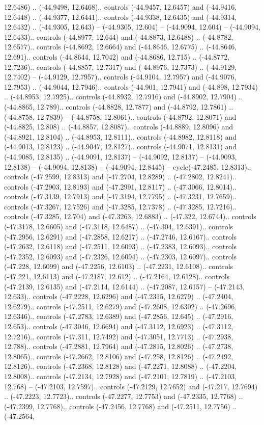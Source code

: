 \begin{scope}[shift={(2.5552, 9.9912)}]
\begin{scope}[shift={(48.1654, -14.8546)}]
12.6486) .. (-44.9498, 12.6468).. controls (-44.9457, 12.6457) and (-44.9416, 12.6448) .. (-44.9377, 12.6441).. controls (-44.9338, 12.6435) and (-44.9314, 12.6432) .. (-44.9305, 12.643) -- (-44.9305, 12.604) -- (-44.9094, 12.604) -- (-44.9094, 12.6433).. controls (-44.8977, 12.644) and (-44.8873, 12.6488) .. (-44.8782, 12.6577).. controls (-44.8692, 12.6664) and (-44.8646, 12.6775) .. (-44.8646, 12.691).. controls (-44.8644, 12.7042) and (-44.8686, 12.715) .. (-44.8772, 12.7236).. controls (-44.8857, 12.7317) and (-44.8976, 12.7373) .. (-44.9129, 12.7402) -- (-44.9129, 12.7957).. controls (-44.9104, 12.7957) and (-44.9076, 12.7953) .. (-44.9044, 12.7946).. controls (-44.901, 12.7941) and (-44.898, 12.7934) .. (-44.8953, 12.7925).. controls (-44.8932, 12.7916) and (-44.8902, 12.7904) .. (-44.8865, 12.789).. controls (-44.8828, 12.7877) and (-44.8792, 12.7861) .. (-44.8758, 12.7839) -- (-44.8758, 12.8061).. controls (-44.8792, 12.8071) and (-44.8825, 12.808) .. (-44.8857, 12.8087).. controls (-44.8889, 12.8096) and (-44.8921, 12.8104) .. (-44.8953, 12.8111).. controls (-44.8982, 12.8118) and (-44.9013, 12.8123) .. (-44.9047, 12.8127).. controls (-44.9071, 12.8131) and (-44.9085, 12.8135) .. (-44.9091, 12.8137) -- (-44.9092, 12.8137) -- (-44.9093, 12.8138) -- (-44.9094, 12.8138) -- (-44.9094, 12.8445) -- cycle(-47.2485, 12.8313).. controls (-47.2599, 12.8313) and (-47.2704, 12.8289) .. (-47.2802, 12.8241).. controls (-47.2903, 12.8193) and (-47.2991, 12.8117) .. (-47.3066, 12.8014).. controls (-47.3139, 12.7913) and (-47.3194, 12.7795) .. (-47.3231, 12.7659).. controls (-47.3267, 12.7526) and (-47.3285, 12.7378) .. (-47.3285, 12.7216).. controls (-47.3285, 12.704) and (-47.3263, 12.6883) .. (-47.322, 12.6744).. controls (-47.3178, 12.6605) and (-47.3118, 12.6487) .. (-47.304, 12.6391).. controls (-47.2956, 12.6291) and (-47.2858, 12.6217) .. (-47.2746, 12.6167).. controls (-47.2632, 12.6118) and (-47.2511, 12.6093) .. (-47.2383, 12.6093).. controls (-47.2352, 12.6093) and (-47.2326, 12.6094) .. (-47.2303, 12.6097).. controls (-47.228, 12.6099) and (-47.2256, 12.6103) .. (-47.2231, 12.6108).. controls (-47.221, 12.6113) and (-47.2187, 12.612) .. (-47.2164, 12.6128).. controls (-47.2139, 12.6135) and (-47.2114, 12.6144) .. (-47.2087, 12.6157) -- (-47.2143, 12.633).. controls (-47.2228, 12.6296) and (-47.2315, 12.6279) .. (-47.2404, 12.6279).. controls (-47.2511, 12.6279) and (-47.2608, 12.6302) .. (-47.2696, 12.6346).. controls (-47.2783, 12.6389) and (-47.2856, 12.645) .. (-47.2916, 12.653).. controls (-47.3046, 12.6694) and (-47.3112, 12.6923) .. (-47.3112, 12.7216).. controls (-47.311, 12.7492) and (-47.3051, 12.7713) .. (-47.2938, 12.788).. controls (-47.2881, 12.7964) and (-47.2815, 12.8026) .. (-47.2738, 12.8065).. controls (-47.2662, 12.8106) and (-47.258, 12.8126) .. (-47.2492, 12.8126).. controls (-47.2368, 12.8128) and (-47.2271, 12.8088) .. (-47.2204, 12.8008).. controls (-47.2134, 12.7928) and (-47.2101, 12.7819) .. (-47.2103, 12.768) -- (-47.2103, 12.7597).. controls (-47.2129, 12.7652) and (-47.217, 12.7694) .. (-47.2223, 12.7723).. controls (-47.2277, 12.7753) and (-47.2335, 12.7768) .. (-47.2399, 12.7768).. controls (-47.2456, 12.7768) and (-47.2511, 12.7756) .. (-47.2564, 
\end{scope}
\end{scope}
